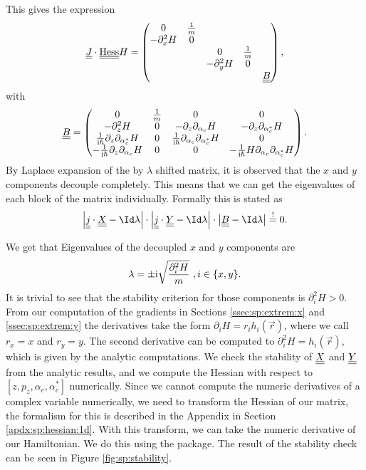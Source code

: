 This gives the expression
\begin{equation}
    \underline{\underline{J}}\cdot \underline{\underline{\mathrm{Hess}}} H = \begin{pmatrix}
        0 & \tfrac1m \\
        -\partial_x^2 H & 0\\
        & & 0 &\tfrac1m \\
        & &  -\partial_y^2 H & 0 \\
        & & & & \underline{\underline{B}}
    \end{pmatrix},
\end{equation}
with
\begin{equation}
    \underline{\underline{B}} = \begin{pmatrix}
        0 & \tfrac1m & 0 & 0 \\
        -\partial_z^2 H & 0 & -\partial_z\partial_{\alpha_c} H 
            & -\partial_z\partial_{\alpha_c^*} H \\
        \tfrac{1}{\mathrm{i}\hbar} \partial_z\partial_{\alpha_c^*} H 
            & 0 & \tfrac{1}{\mathrm{i}\hbar} \partial_{\alpha_c}\partial_{\alpha_c^*} H & 0\\
        -\tfrac{1}{\mathrm{i}\hbar}\partial_z \partial_{\alpha_c} H
            & 0 & 0 & -\tfrac{1}{\mathrm{i}\hbar} H \partial_{\alpha_c}\partial_{\alpha_c^*} H
    \end{pmatrix}.
\end{equation}
By Laplace expansion of the by $\lambda$ shifted matrix,
    it is observed that the $x$ and $y$ components decouple completely.
This means that we can get the eigenvalues of each block of the matrix individually.
Formally this is stated as
\begin{equation}
    \left| \mat{j}\cdot \mat{X}- \Id \lambda \right| \cdot \left| \mat{j}\cdot \mat{Y}- \Id \lambda \right| \cdot \left| \mat{B} - \Id \lambda \right| \overset{!}{=} 0.
\end{equation}

We get that Eigenvalues of the decoupled $x$ and $y$ components are
\begin{equation}
    \lambda = \pm \mathrm{i}\sqrt{\frac{\partial_i^2H}m}~, i \in \{x,y\}.
\end{equation}
It is trivial to see that the stability criterion for those components is 
    $\partial_i^2H > 0$.
From our computation of the gradients in Sections \ref{ssec:sp:extrem:x} and \ref{ssec:sp:extrem:y}
    the derivatives take the form $\partial_i H = r_i h_i(\vec r)$,
    where we call $r_x = x$ and $r_y = y$.
The second derivative can be computed to $\partial_i^2H = h_i(\vec r)$,
    which is given by the analytic computations.
We check the stability of $\underline{\underline{X}}$ and $\underline{\underline{Y}}$ from the analytic results,
    and we compute the Hessian with respect to $[z, p_z, \alpha_c, \alpha_c^*]$ numerically.
Since we cannot compute the numeric derivatives of a complex variable numerically,
    we need to transform the Hessian of our matrix,
    the formalism for this is described in the Appendix in Section \ref{apdx:sp:hessian:1d}.
With this transform, we can take the numeric derivative of our Hamiltonian. 
We do this using the  \cite{FWDiff-Cite} package.
The result of the stability check can be seen in Figure \ref{fig:sp:stability}.

